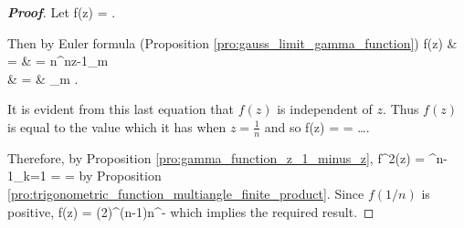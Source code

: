 \begin{proof}[\bf Proof]
Let
\be
f(z) = .
\ee

Then by Euler formula (Proposition \ref{pro:gauss_limit_gamma_function})%
\beast
f(z) & = &  = n^{nz-1}\lim_{m\to\infty}  \\
& = & \lim_{m\to \infty} .
\eeast

It is evident from this last equation that $f(z)$ is independent of $z$. Thus $f(z)$ is equal to the value which it has when $z = \frac 1n$ and so
\be
f(z) =  = \Gamma{}\Gamma{} \dots \Gamma{}.
\ee

Therefore, by Proposition \ref{pro:gamma_function_z_1_minus_z},
\be
f^2(z) = \prod^{n-1}_{k=1} =  = 
\ee
by Proposition \ref{pro:trigonometric_function_multiangle_finite_product}. Since $f(1/n)$ is positive,
\be
f(z) = (2\pi)^{(n-1)}n^{-}
\ee
which implies the required result.
\end{proof}









